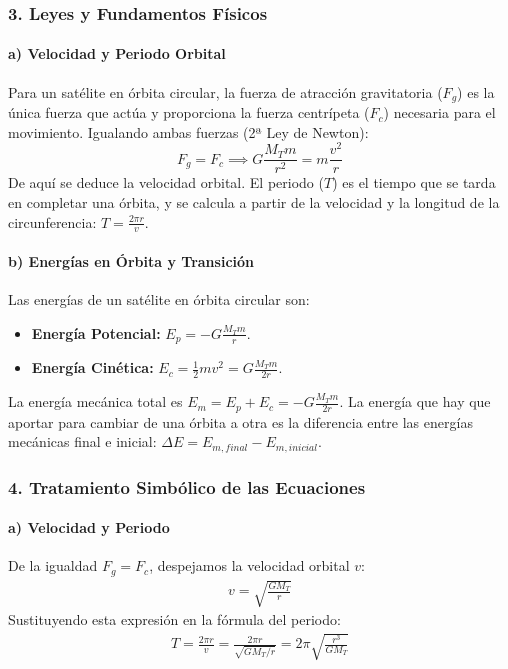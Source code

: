 \subsubsection*{3. Leyes y Fundamentos Físicos}
\paragraph*{a) Velocidad y Periodo Orbital}
Para un satélite en órbita circular, la fuerza de atracción gravitatoria ($F_g$) es la única fuerza que actúa y proporciona la fuerza centrípeta ($F_c$) necesaria para el movimiento. Igualando ambas fuerzas (2ª Ley de Newton):
$$ F_g = F_c \implies G\frac{M_T m}{r^2} = m\frac{v^2}{r} $$
De aquí se deduce la velocidad orbital. El periodo ($T$) es el tiempo que se tarda en completar una órbita, y se calcula a partir de la velocidad y la longitud de la circunferencia: $T = \frac{2\pi r}{v}$.

\paragraph*{b) Energías en Órbita y Transición}
Las energías de un satélite en órbita circular son:
\begin{itemize}
    \item \textbf{Energía Potencial:} $E_p = -G\frac{M_T m}{r}$.
    \item \textbf{Energía Cinética:} $E_c = \frac{1}{2} m v^2 = G\frac{M_T m}{2r}$.
\end{itemize}
La energía mecánica total es $E_m = E_p + E_c = -G\frac{M_T m}{2r}$. La energía que hay que aportar para cambiar de una órbita a otra es la diferencia entre las energías mecánicas final e inicial: $\Delta E = E_{m,final} - E_{m,inicial}$.

\subsubsection*{4. Tratamiento Simbólico de las Ecuaciones}
\paragraph*{a) Velocidad y Periodo}
De la igualdad $F_g = F_c$, despejamos la velocidad orbital $v$:
\begin{gather}
    v = \sqrt{\frac{G M_T}{r}}
\end{gather}
Sustituyendo esta expresión en la fórmula del periodo:
\begin{gather}
    T = \frac{2\pi r}{v} = \frac{2\pi r}{\sqrt{G M_T/r}} = 2\pi \sqrt{\frac{r^3}{G M_T}}
\end{gather}

